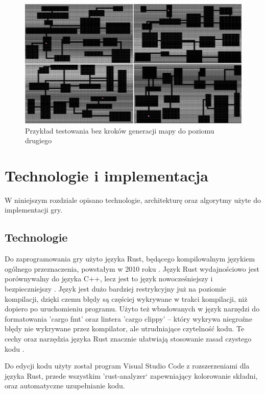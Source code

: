 \documentclass[12pt,twoside]{article}
\begin{document}
\FloatBarrier
\begin{figure}[h]
	\centering
	\includegraphics[width=16cm]{images/mygame/tester_nosteps.png}
	\caption{Przykład testowania bez kroków generacji mapy do poziomu drugiego}
	\label{mygame:tester_nosteps}
\end{figure}
\FloatBarrier

\clearpage	



\section{Technologie i implementacja}
W niniejszym rozdziale opisano technologie, architekturę oraz algorytmy użyte do implementacji gry.


\subsection{Technologie}
Do zaprogramowania gry użyto języka Rust, będącego kompilowalnym językiem ogólnego przeznaczenia, powstałym w 2010 roku \cite{book_rust}. Język Rust wydajnościowo jest porównywalny do języka C++, lecz jest to język nowocześniejszy i bezpieczniejszy \cite{rust_vs_cpp}. Język jest dużo bardziej restrykcyjny już na poziomie kompilacji, dzięki czemu błędy są częściej wykrywane w trakci kompilacji, niż dopiero po uruchomieniu programu. Użyto też wbudowanych w język narzędzi do formatowania 'cargo fmt' oraz lintera 'cargo clippy' -- który wykrywa niegroźne błędy nie wykrywane przez kompilator, ale utrudniające czytelność kodu. Te cechy oraz narzędzia języka Rust znacznie ułatwiają stosowanie zasad czystego kodu \cite{book_czystykod}.

Do edycji kodu użyty został program Visual Studio Code \cite{vs_code} z rozszerzeniami dla języka Rust, przede wszystkim 'rust-analyzer` zapewniający kolorowanie składni, oraz automatyczne uzupełnianie kodu.
\end{document}
